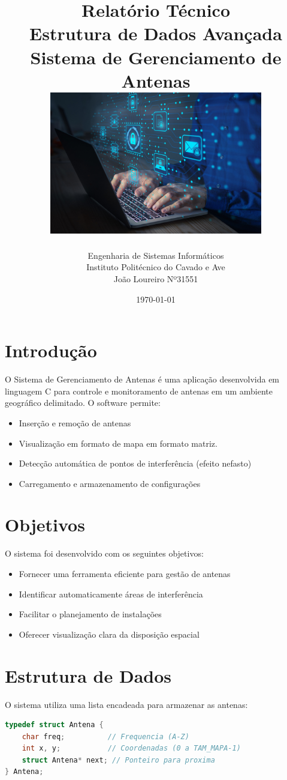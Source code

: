 \documentclass[a4paper, 12pt]{article}
\title{
    \vspace{2cm}
    \textbf{Relatório Técnico} \\
    \large Estrutura de Dados Avançada \\
    \large Sistema de Gerenciamento de Antenas \\
    \vspace{1cm}
    \includegraphics[width=0.7\textwidth]{imagem.jpg} %
    \vspace{3cm}
}
\author{
    Engenharia de Sistemas Informáticos\\
    Instituto Politécnico do Cavado e Ave  \\
    João Loureiro Nº31551 \\
    \vspace{1cm}
}
\date{\today}
\begin{document}
\maketitle
\thispagestyle{empty}
\clearpage

\tableofcontents
\thispagestyle{empty}
\clearpage

\setcounter{page}{1}

\section{Introdução}
O Sistema de Gerenciamento de Antenas é uma aplicação desenvolvida em linguagem C para controle e monitoramento de antenas em um ambiente geográfico delimitado. O software permite:

\begin{itemize}
\item Inserção e remoção de antenas
\item Visualização em formato de mapa em formato matriz.
\item Detecção automática de pontos de interferência (efeito nefasto)
\item Carregamento e armazenamento de configurações
\end{itemize}

\section{Objetivos}
O sistema foi desenvolvido com os seguintes objetivos:

\begin{itemize}
\item Fornecer uma ferramenta eficiente para gestão de antenas
\item Identificar automaticamente áreas de interferência
\item Facilitar o planejamento de instalações
\item Oferecer visualização clara da disposição espacial
\end{itemize}

\section{Estrutura de Dados}
O sistema utiliza uma lista encadeada para armazenar as antenas:

\begin{lstlisting}[language=C]
typedef struct Antena {
    char freq;          // Frequencia (A-Z)
    int x, y;           // Coordenadas (0 a TAM_MAPA-1)
    struct Antena* next; // Ponteiro para proxima
} Antena;
\end{lstlisting}
\end{document}
